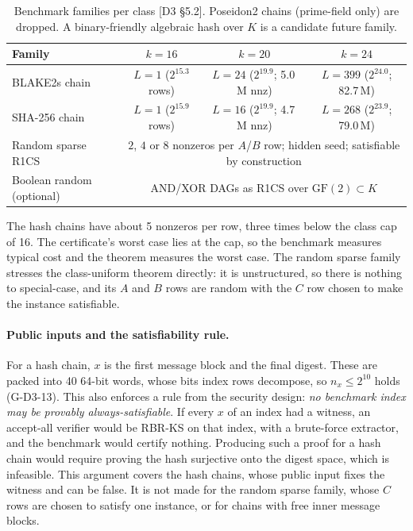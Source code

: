 \begin{table}[t]
\centering\small
\begin{tabular}{@{}lccc@{}}
\toprule
Family & $k=16$ & $k=20$ & $k=24$ \\
\midrule
BLAKE2s chain & $L=1$ ($2^{15.3}$ rows) & $L=24$ ($2^{19.9}$; 5.0\,M nnz) & $L=399$ ($2^{24.0}$; 82.7\,M) \\
SHA-256 chain & $L=1$ ($2^{15.9}$ rows) & $L=16$ ($2^{19.9}$; 4.7\,M nnz) & $L=268$ ($2^{23.9}$; 79.0\,M) \\
Random sparse R1CS & \multicolumn{3}{c}{$2$, $4$ or $8$ nonzeros per $A$/$B$ row; hidden seed; satisfiable by construction} \\
Boolean random (optional) & \multicolumn{3}{c}{AND/XOR DAGs as R1CS over $\mathrm{GF}(2)\subset K$} \\
\bottomrule
\end{tabular}
\caption{Benchmark families per class [D3 §5.2]. Poseidon2 chains (prime-field only) are dropped. A
binary-friendly algebraic hash over $K$ is a candidate future family.}
\label{tab:bench-chains}
\end{table}

The hash chains have about 5 nonzeros per row, three times below the class cap of 16. The
certificate's worst case lies at the cap, so the benchmark measures typical cost and the theorem
measures the worst case. The random sparse family stresses the class-uniform theorem directly: it is
unstructured, so there is nothing to special-case, and its $A$ and $B$ rows are random with the $C$
row chosen to make the instance satisfiable.

\paragraph{Public inputs and the satisfiability rule.} For a hash chain, $x$ is the first message
block and the final digest. These are packed into 40 64-bit words, whose bits index rows decompose,
so $n_x\le2^{10}$ holds (G-D3-13). This also enforces a rule from the security design: \emph{no
benchmark index may be provably always-satisfiable}. If every $x$ of an index had a witness, an
accept-all verifier would be RBR-KS on that index, with a brute-force extractor, and the benchmark
would certify nothing. Producing such a proof for a hash chain would require proving the hash
surjective onto the digest space, which is infeasible. This argument covers the hash chains, whose
public input fixes the witness and can be false. It is not made for the random sparse family, whose
$C$ rows are chosen to satisfy one instance, or for chains with free inner message blocks.

